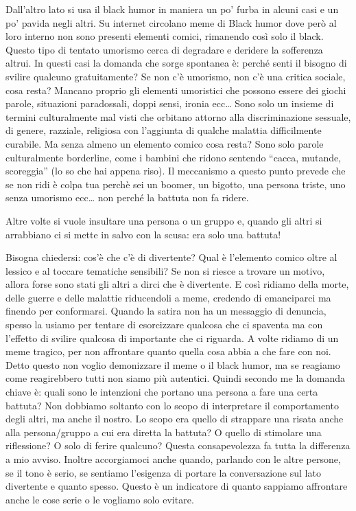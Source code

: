 \documentclass[12pt]{book} %
\begin{document}
\begin{mdframed}[linewidth=1pt]
Dall'altro lato si usa il black humor in maniera un po' furba in alcuni casi e
un po' pavida negli altri. Su internet circolano meme di Black humor dove però al loro interno non
sono presenti elementi comici, rimanendo così solo il black. Questo tipo di tentato umorismo cerca di degradare e
deridere la sofferenza altrui. In questi casi la domanda che sorge spontanea è: perché senti il bisogno di svilire
qualcuno gratuitamente? Se non c'è umorismo, non c'è una critica sociale, cosa resta? Mancano proprio gli elementi
umoristici che possono essere dei giochi parole, situazioni paradossali, doppi sensi, ironia ecc… Sono solo un insieme
di termini culturalmente mal visti che orbitano attorno alla discriminazione sessuale, di genere, razziale, religiosa
con l'aggiunta di qualche malattia difficilmente curabile. Ma senza almeno un elemento comico cosa
resta? Sono solo parole culturalmente borderline, come i bambini che ridono sentendo “cacca, mutande, scoreggia” (lo so
che hai appena riso). Il meccanismo a questo punto prevede che se non ridi è colpa tua perchè sei un boomer, un
bigotto, una persona triste, uno senza umorismo ecc… non perché la battuta non fa ridere.

Altre volte si vuole insultare una persona o un gruppo e, quando gli altri si arrabbiano ci si mette in salvo con la
scusa: era solo una battuta!


\bigskip

Bisogna chiedersi: cos'è che c'è di divertente? Qual è l'elemento comico oltre al lessico e al
toccare tematiche sensibili? Se non si riesce a trovare un motivo, allora forse sono stati gli altri a dirci che è
divertente. E così ridiamo della morte, delle guerre e delle malattie riducendoli a meme, credendo di emanciparci ma
finendo per conformarsi. Quando la satira non ha un messaggio di denuncia, spesso la usiamo per tentare di esorcizzare
qualcosa che ci spaventa ma con l'effetto di svilire qualcosa di importante che ci riguarda. A volte ridiamo di un meme
tragico, per non affrontare quanto quella cosa abbia a che fare con noi. Detto questo non voglio demonizzare il meme o
il black humor, ma se reagiamo come reagirebbero tutti non siamo più autentici.
\newline
\newline
Quindi secondo me la domanda chiave è: quali sono le intenzioni che portano una persona a fare una certa battuta? Non
dobbiamo soltanto con lo scopo di interpretare il comportamento degli altri, ma anche il nostro. Lo scopo era quello di
strappare una risata anche alla persona/gruppo a cui era diretta la battuta? O quello di stimolare una riflessione? O
solo di ferire qualcuno? Questa consapevolezza fa tutta la differenza a mio avviso. Inoltre accorgiamoci anche quando,
parlando con le altre persone, se il tono è serio, se sentiamo l'esigenza di portare la
conversazione sul lato divertente e quanto spesso. Questo è un indicatore di quanto sappiamo affrontare anche le cose
serie o le vogliamo solo evitare.



\end{mdframed}
\end{document}
